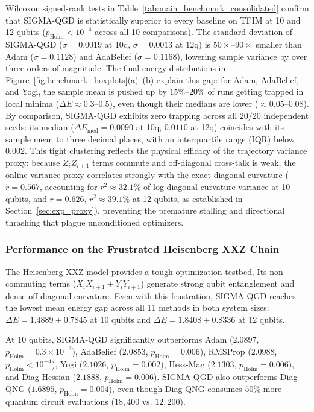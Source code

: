 \documentclass[11pt,a4paper]{article}
\begin{document}
Wilcoxon signed-rank tests in Table~\ref{tab:main_benchmark_consolidated} confirm that SIGMA-QGD is statistically superior to every baseline on TFIM at 10 and 12 qubits ($p_{\text{Holm}} < 10^{-4}$ across all 10 comparisons). The standard deviation of SIGMA-QGD ($\sigma = 0.0019$ at 10q, $\sigma = 0.0013$ at 12q) is $50\times\text{--}90\times$ smaller than Adam ($\sigma = 0.1128$) and AdaBelief ($\sigma = 0.1168$), lowering sample variance by over three orders of magnitude. The final energy distributions in Figure~\ref{fig:benchmark_boxplots}(a)--(b) explain this gap: for Adam, AdaBelief, and Yogi, the sample mean is pushed up by $15\%\text{--}20\%$ of runs getting trapped in local minima ($\Delta E \approx 0.3\text{--}0.5$), even though their medians are lower ($\approx 0.05\text{--}0.08$). By comparison, SIGMA-QGD exhibits zero trapping across all $20/20$ independent seeds: its median ($\Delta E_{\text{med}} = 0.0090$ at 10q, $0.0110$ at 12q) coincides with its sample mean to three decimal places, with an interquartile range (IQR) below $0.002$. This tight clustering reflects the physical efficacy of the trajectory variance proxy: because $Z_i Z_{i+1}$ terms commute and off-diagonal cross-talk is weak, the online variance proxy correlates strongly with the exact diagonal curvature ($r = 0.567$, accounting for $r^2 \approx 32.1\%$ of log-diagonal curvature variance at 10 qubits, and $r = 0.626$, $r^2 \approx 39.1\%$ at 12 qubits, as established in Section~\ref{sec:exp_proxy}), preventing the premature stalling and directional thrashing that plague unconditioned optimizers.

\subsubsection{Performance on the Frustrated Heisenberg XXZ Chain}
The Heisenberg XXZ model provides a tough optimization testbed. Its non-commuting terms ($X_i X_{i+1} + Y_i Y_{i+1}$) generate strong qubit entanglement and dense off-diagonal curvature. Even with this frustration, SIGMA-QGD reaches the lowest mean energy gap across all 11 methods in both system sizes: $\Delta E = 1.4889 \pm 0.7845$ at 10 qubits and $\Delta E = 1.8408 \pm 0.8336$ at 12 qubits.

At 10 qubits, SIGMA-QGD significantly outperforms Adam ($2.0897$, $p_{\text{Holm}} = 0.3 \times 10^{-3}$), AdaBelief ($2.0853$, $p_{\text{Holm}} = 0.006$), RMSProp ($2.0988$, $p_{\text{Holm}} < 10^{-4}$), Yogi ($2.1026$, $p_{\text{Holm}} = 0.002$), Hess-Mag ($2.1303$, $p_{\text{Holm}} = 0.006$), and Diag-Hessian ($2.1888$, $p_{\text{Holm}} = 0.006$). SIGMA-QGD also outperforms Diag-QNG ($1.6895$, $p_{\text{Holm}} = 0.004$), even though Diag-QNG consumes $50\%$ more quantum circuit evaluations ($18,400$ vs. $12,200$). 
\end{document}
